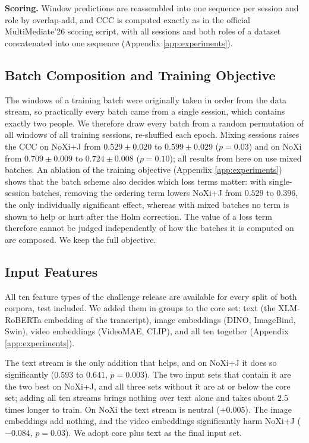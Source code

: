 \documentclass[10pt,a4paper,twocolumn]{article}
\begin{document}
	\textbf{Scoring.} Window predictions are reassembled into one sequence per session and role by overlap-add, and CCC is computed exactly as in the official MultiMediate'26 scoring script, with all sessions and both roles of a dataset concatenated into one sequence (Appendix \ref{app:experiments}).

	\subsection{Batch Composition and Training Objective}
	\label{sec:batches}
	The windows of a training batch were originally taken in order from the data stream, so practically every batch came from a single session, which contains exactly two people. We therefore draw every batch from a random permutation of all windows of all training sessions, re-shuffled each epoch. Mixing sessions raises the CCC on NoXi+J from $0.529 \pm 0.020$ to $0.599 \pm 0.029$ ($p = 0.03$) and on NoXi from $0.709 \pm 0.009$ to $0.724 \pm 0.008$ ($p = 0.10$); all results from here on use mixed batches. An ablation of the training objective (Appendix \ref{app:experiments}) shows that the batch scheme also decides which loss terms matter: with single-session batches, removing the ordering term lowers NoXi+J from $0.529$ to $0.396$, the only individually significant effect, whereas with mixed batches no term is shown to help or hurt after the Holm correction. The value of a loss term therefore cannot be judged independently of how the batches it is computed on are composed. We keep the full objective.

	\subsection{Input Features}
	\label{sec:features}
	All ten feature types of the challenge release are available for every split of both corpora, test included. We added them in groups to the core set: text (the XLM-RoBERTa embedding of the transcript), image embeddings (DINO, ImageBind, Swin), video embeddings (VideoMAE, CLIP), and all ten together (Appendix \ref{app:experiments}).



	The text stream is the only addition that helps, and on NoXi+J it does so significantly ($0.593$ to $0.641$, $p = 0.003$). The two input sets that contain it are the two best on NoXi+J, and all three sets without it are at or below the core set; adding all ten streams brings nothing over text alone and takes about $2.5$ times longer to train. On NoXi the text stream is neutral ($+0.005$). The image embeddings add nothing, and the video embeddings significantly harm NoXi+J ($-0.084$, $p = 0.03$). We adopt core plus text as the final input set.
\end{document}
